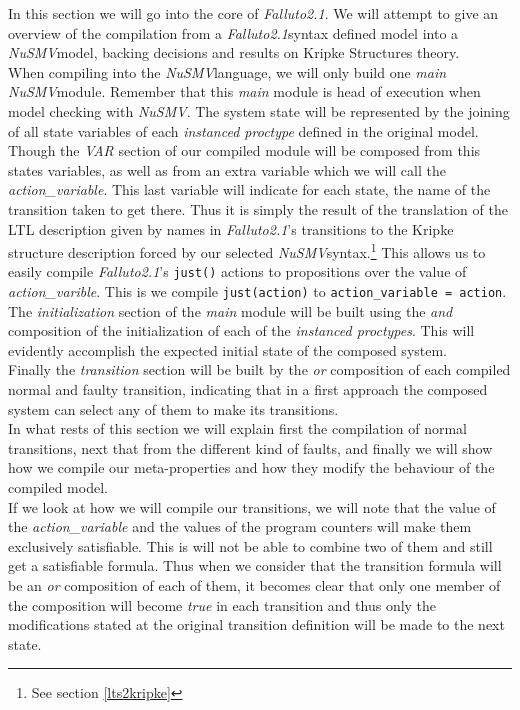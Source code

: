 \documentclass[12pt]{article}
\newcommand{\nusmv}{\mbox{\textit{NuSMV}}}
\newcommand{\falluto}{\mbox{\textit{Falluto2.1}}}
\begin{document}
In this section we will go into the core of \falluto. We will attempt to give an overview of the compilation from a \falluto syntax defined model into a \nusmv model, backing decisions and results on Kripke Structures theory.\\
When compiling into the \nusmv language, we will only build one \textit{main} \nusmv module. Remember that this \textit{main} module is head of execution when model checking with \nusmv. The system state will be represented by the joining of all state variables of each \textit{instanced proctype} defined in the original model. Though the \textit{VAR} section of our compiled module will be composed from this states variables, as well as from an extra variable which we will call the \textit{action\_variable}. This last variable will indicate for each state, the name of the transition taken to get there. Thus it is simply the result of the translation of the LTL description given by names in \falluto's transitions to the Kripke structure description forced by our selected \nusmv syntax.\footnote{ See section \ref{lts2kripke} } This allows us to easily compile \falluto's \texttt{just()} actions to propositions over the value of \textit{action\_varible}. This is we compile \texttt{just(action)} to \texttt{action\_variable = action}.\\
The \textit{initialization} section of the \textit{main} module will be built using the \textit{and} composition of the initialization of each of the \textit{instanced proctypes}. This will evidently accomplish the expected initial state of the composed system.\\
Finally the \textit{transition} section will be built by the \textit{or} composition of each compiled normal and faulty transition, indicating that in a first approach the composed system can select any of them to make its transitions.\\
In what rests of this section we will explain first the compilation of normal transitions, next that from the different kind of faults, and finally we will show how we compile our meta-properties and how they modify the behaviour of the compiled model.\\
If we look at how we will compile our transitions, we will note that the value of the \textit{action\_variable} and the values of the program counters will make them exclusively satisfiable. This is will not be able to combine two of them and still get a satisfiable formula. Thus when we consider that the transition formula will be an \textit{or} composition of each of them, it becomes clear that only one member of the composition will become \textit{true} in each transition and thus only the modifications stated at the original transition definition will be made to the next state.
\end{document}
